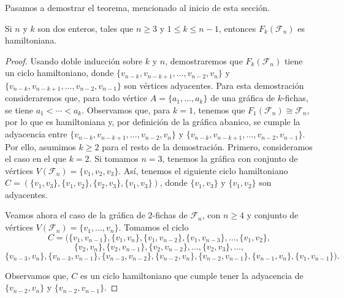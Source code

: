 Pasamos a demostrar el teorema, mencionado al inicio de esta secci\'on.
    
\begin{teorema}
\label{teo:hamilt-SFan}
    Si $n$ y $k$ son dos enteros, tales que $n \geq 3$ y $1 \leq k \leq n-1$,
    entonces $F_k(\mathcal{F}_n)$ es hamiltoniana.
\end{teorema}
    
\begin{proof}
    Usando doble inducci\'on sobre $k$ y $n$, demostraremos que
    $F_k(\mathcal{F}_n)$ tiene un ciclo hamiltoniano, donde $\{v_{n-k},
    v_{n-k+1}, \dots, v_{n-2}, v_n\}$ y $\{v_{n-k}, v_{n-k+1}, \dots, v_{n-2},
    v_{n-1}\}$ son v\'ertices adyacentes. Para esta demostraci\'on
    consideraremos que, para todo v\'ertice $A = \{a_1, \dots, a_k\}$ de una
    gr\'afica de $k$-fichas, se tiene $a_1 < \cdots < a_k$. Observamos que, para
    $k =1$, tenemos que $F_1(\mathcal{F}_n) \cong \mathcal{F}_n$, por lo que es
    hamiltoniana y, por definici\'on de la gr\'afica abanico, se cumple la
    adyacencia entre $\{v_{n-k}, v_{n-k+1}, \dots, v_{n-2}, v_n\}$ y $\{v_{n-k},
    v_{n-k+1}, \dots, v_{n-2}, v_{n-1}\}$. Por ello, asumimos $k \geq 2$ para el
    resto de la demostraci\'on. Primero, consideramos el caso en el que $k =2$.
    Si tomamos $n = 3$, tenemos la gr\'afica con conjunto de v\'ertices
    $V(\mathcal{F}_n)=\{v_1, v_2, v_3\}$. As\'i, tenemos el siguiente ciclo
    hamiltoniano $C= (\{v_1,v_3\},\{v_1,v_2\},\{v_2,v_3\}, \{v_1,v_3\})$, donde
    $\{v_1, v_3\}$ y $\{v_1, v_2\}$ son adyacentes. 
            
    Veamos ahora el caso de la gr\'afica de $2$-fichas de $\mathcal{F}_n$, con
    $n \geq 4$ y conjunto de v\'ertices $V(\mathcal{F}_n)=\{v_1,\dots, v_n\}$.
    Tomamos el ciclo
    \[
    C = (\{v_1, v_{n-1}\},\{v_1, v_n\},\{v_1, v_{n-2}\}, \{v_1, v_{n-3}\},
    \dots, \{v_1, v_2\},\]
    \[\{v_2, v_n\}, \{v_2, v_{n-1}\}, \{v_2, v_{n-2}\}, \dots, \{v_2,v_3\},\dots,\]
    \[\{v_{n-3},v_n\}, \{v_{n-3}, v_{n-1}\},\{v_{n-3},v_{n-2}\}, \{v_{n-2},
    v_n\},\{v_{n-2}, v_{n-1}\}, \{v_{n-1}, v_n\}, \{v_1, v_{n-1}\}).\]
    
    Observamos que, $C$ es un ciclo hamiltoniano que cumple tener la adyacencia
    de  $\{v_{n-2}, v_n\}$ y $\{v_{n-2}, v_{n-1}\}$. 
    

\end{proof}
